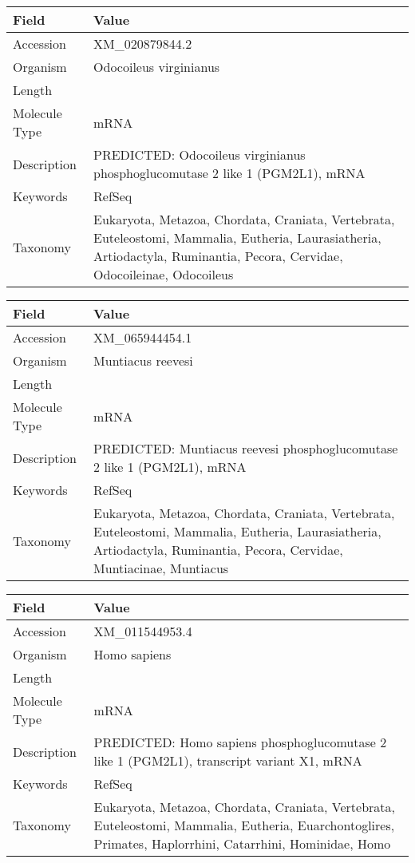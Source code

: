 \documentclass[10pt]{article}
\begin{document}
\vspace{1em}
{\footnotesize
\begin{longtable}{>{\raggedright\arraybackslash}p{4.5cm} >{\raggedright\arraybackslash}p{11.5cm}}
\textbf{Field} & \textbf{Value} \\
\hline
Accession & XM\_020879844.2 \\
Organism & Odocoileus virginianus \\
Length & 7622 \\
Molecule Type & mRNA \\
Description & PREDICTED: Odocoileus virginianus phosphoglucomutase 2 like 1 (PGM2L1), mRNA \\
Keywords & RefSeq \\
Taxonomy & Eukaryota, Metazoa, Chordata, Craniata, Vertebrata, Euteleostomi, Mammalia, Eutheria, Laurasiatheria, Artiodactyla, Ruminantia, Pecora, Cervidae, Odocoileinae, Odocoileus \\
\end{longtable}
}

\vspace{1em}
{\footnotesize
\begin{longtable}{>{\raggedright\arraybackslash}p{4.5cm} >{\raggedright\arraybackslash}p{11.5cm}}
\textbf{Field} & \textbf{Value} \\
\hline
Accession & XM\_065944454.1 \\
Organism & Muntiacus reevesi \\
Length & 7522 \\
Molecule Type & mRNA \\
Description & PREDICTED: Muntiacus reevesi phosphoglucomutase 2 like 1 (PGM2L1), mRNA \\
Keywords & RefSeq \\
Taxonomy & Eukaryota, Metazoa, Chordata, Craniata, Vertebrata, Euteleostomi, Mammalia, Eutheria, Laurasiatheria, Artiodactyla, Ruminantia, Pecora, Cervidae, Muntiacinae, Muntiacus \\
\end{longtable}
}

\vspace{1em}
{\footnotesize
\begin{longtable}{>{\raggedright\arraybackslash}p{4.5cm} >{\raggedright\arraybackslash}p{11.5cm}}
\textbf{Field} & \textbf{Value} \\
\hline
Accession & XM\_011544953.4 \\
Organism & Homo sapiens \\
Length & 8540 \\
Molecule Type & mRNA \\
Description & PREDICTED: Homo sapiens phosphoglucomutase 2 like 1 (PGM2L1), transcript variant X1, mRNA \\
Keywords & RefSeq \\
Taxonomy & Eukaryota, Metazoa, Chordata, Craniata, Vertebrata, Euteleostomi, Mammalia, Eutheria, Euarchontoglires, Primates, Haplorrhini, Catarrhini, Hominidae, Homo \\
\end{longtable}
}
\end{document}

